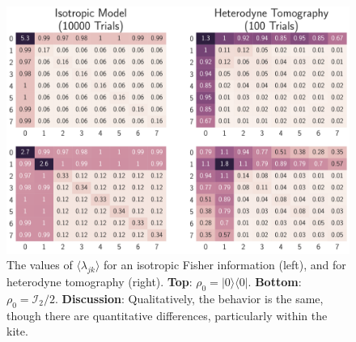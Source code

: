 \documentclass[aps,pra, twocolumn]{revtex4-1}
\begin{document}
 
\begin{figure}[t]
  \includegraphics[width=\columnwidth]{Images/Figure_13.pdf}
 \caption{The values of $\langle \lambda_{jk} \rangle$ for an isotropic Fisher information (left), and for heterodyne tomography (right). \textbf{Top}: $\rho_{0} = |0\rangle\langle 0|$. \textbf{Bottom}: $\rho_{0} = \mathcal{I}_{2}/2$. \textbf{Discussion}: Qualitatively, the behavior is the same, though there are quantitative differences, particularly within the kite.}
\label{fig:model_comparison}
\end{figure}
\end{document}
